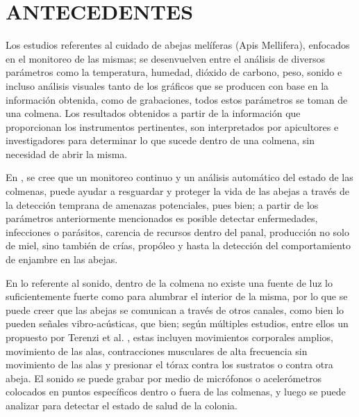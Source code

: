 \documentclass[12pt]{report}
\begin{document}
	
	\chapter{ANTECEDENTES}
	
	Los estudios referentes al cuidado de abejas melíferas (Apis Mellifera), enfocados en el monitoreo de las mismas; se desenvuelven entre el análisis de diversos parámetros como la temperatura, humedad, dióxido de carbono, peso, sonido e incluso análisis visuales tanto de los gráficos que se producen con base en la información obtenida, como de grabaciones, todos estos parámetros se toman de una colmena. Los resultados obtenidos a partir de la información que proporcionan los instrumentos pertinentes, son interpretados por apicultores e investigadores para determinar lo que sucede dentro de una colmena, sin necesidad de abrir la misma.
	
	\par En \cite{cecchi2020smart}, se cree que un monitoreo continuo y un análisis automático del estado de las colmenas, puede ayudar a resguardar y proteger la vida de las abejas a través de la detección temprana de amenazas potenciales, pues bien; a partir de los parámetros anteriormente mencionados es posible detectar enfermedades, infecciones o parásitos, carencia de recursos dentro del panal, producción no solo de miel, sino también de crías, propóleo y hasta la detección del comportamiento de enjambre en las abejas.
	
	\par En lo referente al sonido, dentro de la colmena no existe una fuente de luz lo suficientemente fuerte como para alumbrar el interior de la misma, por lo que se puede creer que las abejas se comunican a través de otros canales, como bien lo pueden señales vibro-acústicas, que bien; según múltiples estudios, entre ellos un propuesto por Terenzi et al. \cite{terenzi2020importance}, estas incluyen movimientos corporales amplios, movimiento de las alas, contracciones musculares de alta frecuencia sin movimiento de las alas y presionar el tórax contra los sustratos o contra otra abeja. El sonido se puede grabar por medio de micrófonos o acelerómetros colocados en puntos específicos dentro o fuera de las colmenas, y luego se puede analizar para detectar el estado de salud de la colonia.
	
\end{document}
